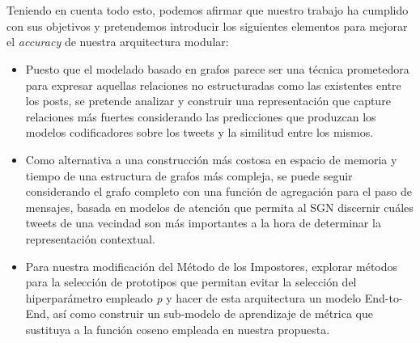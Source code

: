 \\\\
Teniendo en cuenta todo esto, podemos afirmar que nuestro trabajo ha cumplido con sus objetivos y pretendemos introducir los siguientes elementos para mejorar el \textit{accuracy} de nuestra arquitectura modular:
\begin{itemize}
	\item Puesto que el modelado basado en grafos parece ser una técnica prometedora para expresar aquellas relaciones no estructuradas como las existentes entre los posts, se pretende analizar y construir una representación que capture relaciones más fuertes considerando las predicciones que produzcan los modelos codificadores sobre los tweets y la similitud entre los mismos.
	\item Como alternativa a una construcción más costosa en espacio de memoria y tiempo de una estructura de grafos más compleja, se puede seguir considerando el grafo completo con una función de agregación para el paso de mensajes, basada en modelos de atención que permita al SGN discernir cuáles tweets de una vecindad son más importantes a la hora de determinar la representación contextual.
	\item Para nuestra modificación del Método de los Impostores, explorar métodos para la selección de prototipos que permitan evitar la selección del hiperparámetro empleado \textit{p} y hacer de esta arquitectura un modelo End-to-End, así como construir un sub-modelo de aprendizaje de métrica que sustituya a la función coseno empleada en nuestra propuesta.
\end{itemize}
\clearpage